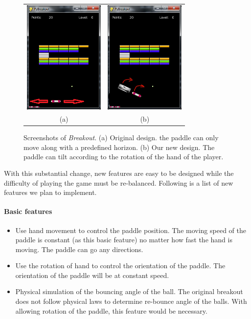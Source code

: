 \documentclass[10pt,twocolumn,letterpaper]{article}
\begin{document}
\begin{figure}[h]
\centering
\begin{tabular}{cc}
\includegraphics[width=4cm]{pics/horizontal.png} &
\includegraphics[width=4cm]{pics/tilt.png} \\
(a) &
(b)  
\end{tabular}
\caption{Screenshots of \emph{Breakout}. (a) Original design. 
the paddle can only move along with a predefined horizon. 
(b) Our new design. The paddle can tilt according to the rotation 
of the hand of the player.}
\label{fig:gamescreen}
\end{figure}

With this substantial change, new features are easy to be designed while the 
difficulty of playing the game must be re-balanced. Following is 
a list of new features we plan to implement.

\paragraph{Basic features}
\begin{itemize}
	\item Use hand movement to control the paddle position. The moving speed of the paddle is constant (as this basic feature) no matter how fast the hand is moving. The paddle can go any directions.
	\item Use the rotation of hand to control the orientation of the paddle. The orientation of the paddle will be at constant speed.
	\item Physical simulation of the bouncing angle of the ball. The original breakout does not follow physical laws to determine re-bounce angle of the balls. With allowing rotation of the paddle, this feature would be necessary. 
\end{itemize}
\end{document}
